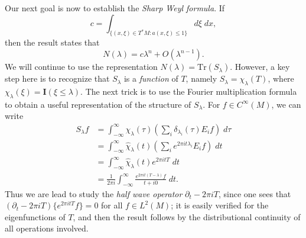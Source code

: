Our next goal is now to establish the \emph{Sharp Weyl formula}. If
%
\[ c = \int_{\{ (x,\xi) \in T^*M : a(x,\xi) \leq 1 \}} d\xi\; dx, \]
%
then the result states that
%
\[ N(\lambda) = c \lambda^n + O(\lambda^{n-1}). \]
%
We will continue to use the representation $N(\lambda) = \text{Tr}(S_\lambda)$. However, a key step here is to recognize that $S_\lambda$ is a \emph{function} of $T$, namely $S_\lambda = \chi_\lambda(T)$, where $\chi_\lambda(\xi) = \mathbf{I}(\xi \leq \lambda)$. The next trick is to use the Fourier multiplication formula to obtain a useful representation of the structure of $S_\lambda$. For $f \in C^\infty(M)$, we can write
%
\begin{align*}
    S_\lambda f &= \int_{-\infty}^\infty \chi_\lambda(\tau) \left( \sum_i \delta_{\lambda_i}(\tau) E_i f \right)\; d\tau\\
    &= \int_{-\infty}^\infty \widehat{\chi}_\lambda(t) \left( \sum_i e^{2 \pi i t \lambda_i} E_i f \right)\; dt\\
    &= \int_{-\infty}^\infty \widehat{\chi}_\lambda(t) e^{2 \pi i t T}\; dt\\
    &= \frac{1}{2 \pi i} \int_{-\infty}^\infty \frac{e^{2 \pi i t (T - \lambda)} f}{t + i0}\; dt.
\end{align*}
%
Thus we are lead to study the \emph{half wave operator} $\partial_t - 2 \pi i T$, since one sees that $(\partial_t - 2 \pi i T) \{ e^{2 \pi i t T} f \} = 0$ for all $f \in L^2(M)$; it is easily verified for the eigenfunctions of $T$, and then the result follows by the distributional continuity of all operations involved.

